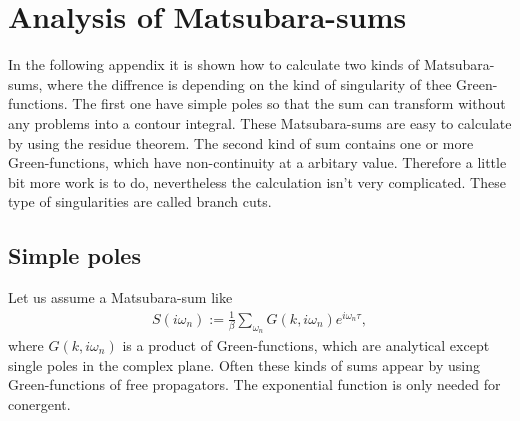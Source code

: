 \chapter{Analysis of Matsubara-sums}
\label{app: analysis of Matsubara-sums}

In the following appendix it is shown how to calculate two kinds of Matsubara-sums, where the diffrence is depending on the kind of singularity of thee Green-functions.
The first one have simple poles so that the sum can transform without any problems into a contour integral.
These Matsubara-sums are easy to calculate by using the residue theorem.
The second kind of sum contains one or more Green-functions, which have non-continuity at a arbitary value.
Therefore a little bit more work is to do, nevertheless the calculation isn't very complicated.
These type of singularities are called branch cuts.

\section{Simple poles} 
\label{app: simples poles}
Let us assume a Matsubara-sum like
%
\begin{align}
	S(i\omega_{n}) := \frac{1}{\beta} \sum\limits_{\omega_{n}} G(k,i\omega_{n}) e^{i\omega_{n}\tau},
\end{align}
%
where $G(k,i\omega_{n})$ is a product of Green-functions, which are analytical except single poles in the complex plane.
Often these kinds of sums appear by using Green-functions of free propagators.
The exponential function is only needed for conergent.